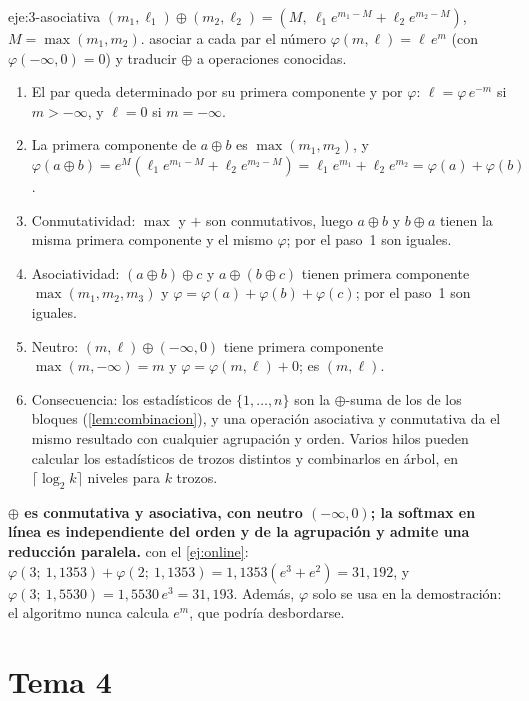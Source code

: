 \begin{solucion}{eje:3-asociativa}
\datos $(m_1,\ell_1)\oplus(m_2,\ell_2)=(M,\ \ell_1e^{m_1-M}+\ell_2e^{m_2-M})$, $M=\max(m_1,m_2)$.
\planteamiento asociar a cada par el número $\varphi(m,\ell)=\ell\,e^{m}$ (con $\varphi(-\infty,0)=0$) y traducir $\oplus$ a operaciones conocidas.
\pasos
\begin{enumerate}[label=\arabic*.]
  \item El par queda determinado por su primera componente y por $\varphi$: $\ell=\varphi\,e^{-m}$ si $m>-\infty$, y $\ell=0$ si $m=-\infty$.
  \item La primera componente de $a\oplus b$ es $\max(m_1,m_2)$, y $\varphi(a\oplus b)=e^{M}(\ell_1e^{m_1-M}+\ell_2e^{m_2-M})=\ell_1e^{m_1}+\ell_2e^{m_2}=\varphi(a)+\varphi(b)$.
  \item Conmutatividad: $\max$ y $+$ son conmutativos, luego $a\oplus b$ y $b\oplus a$ tienen la misma primera componente y el mismo $\varphi$; por el paso~1 son iguales.
  \item Asociatividad: $(a\oplus b)\oplus c$ y $a\oplus(b\oplus c)$ tienen primera componente $\max(m_1,m_2,m_3)$ y $\varphi=\varphi(a)+\varphi(b)+\varphi(c)$; por el paso~1 son iguales.
  \item Neutro: $(m,\ell)\oplus(-\infty,0)$ tiene primera componente $\max(m,-\infty)=m$ y $\varphi=\varphi(m,\ell)+0$; es $(m,\ell)$.
  \item Consecuencia: los estadísticos de $\{1,\dots,n\}$ son la $\oplus$-suma de los de los bloques (\cref{lem:combinacion}), y una operación asociativa y conmutativa da el mismo resultado con cualquier agrupación y orden. Varios hilos pueden calcular los estadísticos de trozos distintos y combinarlos en árbol, en $\lceil\log_2 k\rceil$ niveles para $k$ trozos. \qedhere
\end{enumerate}
\resultado \textbf{$\oplus$ es conmutativa y asociativa, con neutro $(-\infty,0)$; la softmax en línea es independiente del orden y de la agrupación y admite una reducción paralela.}
\comprobacion con el \cref{ej:online}: $\varphi(3;\ 1{,}1353)+\varphi(2;\ 1{,}1353)=1{,}1353(e^{3}+e^{2})=31{,}192$, y $\varphi(3;\ 1{,}5530)=1{,}5530\,e^{3}=31{,}193$. Además, $\varphi$ solo se usa en la demostración: el algoritmo nunca calcula $e^{m}$, que podría desbordarse.
\end{solucion}

\section{Tema 4}

